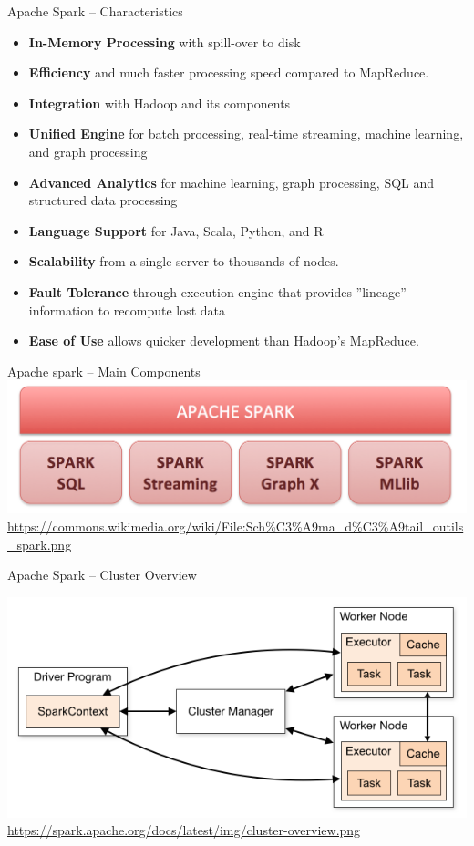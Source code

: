 \documentclass[ignorenonframetext,xcolor=x11names]{beamer}
\begin{document}
\begin{frame}{Apache Spark -- Characteristics}
\small
\begin{itemize}
    \item \textbf{In-Memory Processing} with spill-over to disk
    \item \textbf{Efficiency} and much faster processing speed compared to MapReduce.
    \item \textbf{Integration} with Hadoop and its components
    \item \textbf{Unified Engine} for batch processing, real-time streaming, machine learning, and graph processing
    \item \textbf{Advanced Analytics} for machine learning, graph processing, SQL and structured data processing
    \item \textbf{Language Support} for Java, Scala, Python, and R
    \item \textbf{Scalability} from a single server to thousands of nodes.
    \item \textbf{Fault Tolerance} through execution engine that provides ''lineage'' information to recompute lost data
    \item \textbf{Ease of Use} allows quicker development than Hadoop's MapReduce.
\end{itemize}
\end{frame}

\begin{frame}{Apache spark -- Main Components}
\centering
\includegraphics[width=.8\textwidth]{spark_components.png}
\scriptsize \url{https://commons.wikimedia.org/wiki/File:Sch\%C3\%A9ma_d\%C3\%A9tail_outils_spark.png} \normalsize
\end{frame}

\begin{frame}{Apache Spark -- Cluster Overview}
\begin{center}
\includegraphics[width=.8\textwidth]{cluster-overview.png}
\scriptsize \url{https://spark.apache.org/docs/latest/img/cluster-overview.png}
\end{center}
\end{frame}
\end{document}
